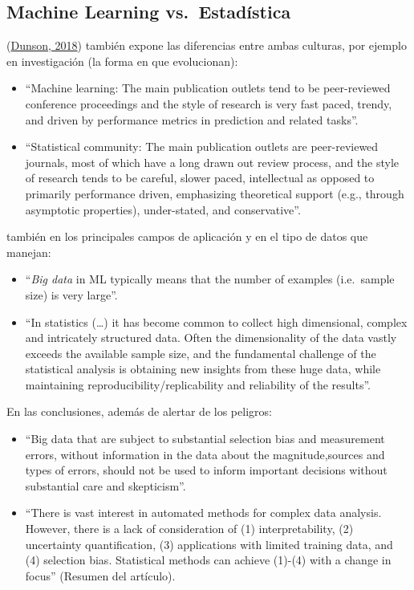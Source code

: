\documentclass[
]{book}
\theoremstyle{break}
\theoremstyle{nonumberplain}
\begin{document}
\hypertarget{machine-learning-vs.-estaduxedstica}{%
\subsection{Machine Learning vs.~Estadística}\label{machine-learning-vs.-estaduxedstica}}

(\protect\hyperlink{ref-dunson2018statistics}{Dunson, 2018}) también expone las diferencias entre ambas culturas, por ejemplo en investigación (la forma en que evolucionan):

\begin{itemize}
\item
  ``Machine learning: The main publication outlets tend to be peer-reviewed conference proceedings and the style of research is very fast paced, trendy, and driven by performance metrics in prediction and related tasks''.
\item
  ``Statistical community: The main publication outlets are peer-reviewed journals, most of which have a long drawn out review process, and the style of research tends to be careful, slower paced, intellectual as opposed to primarily performance driven, emphasizing theoretical support (e.g., through asymptotic properties), under-stated, and conservative''.
\end{itemize}

también en los principales campos de aplicación y en el tipo de datos que manejan:

\begin{itemize}
\item
  ``\emph{Big data} in ML typically means that the number of examples (i.e.~sample size) is very large''.
\item
  ``In statistics (\ldots) it has become common to collect high dimensional, complex and intricately structured data. Often the dimensionality of the data vastly exceeds the available sample size, and the fundamental challenge of the statistical analysis is obtaining new insights from these huge data, while maintaining reproducibility/replicability and reliability of the results''.
\end{itemize}

En las conclusiones, además de alertar de los peligros:

\begin{itemize}
\item
  ``Big data that are subject to substantial selection bias and measurement errors, without information in the data about the magnitude,sources and types of errors, should not be used to inform important decisions without substantial care and skepticism''.
\item
  ``There is vast interest in automated methods for complex data analysis. However, there is a lack of consideration of (1) interpretability, (2) uncertainty quantification, (3) applications with limited training data, and (4) selection bias. Statistical methods can achieve (1)-(4) with a change in focus'' (Resumen del artículo).
\end{itemize}
\end{document}
